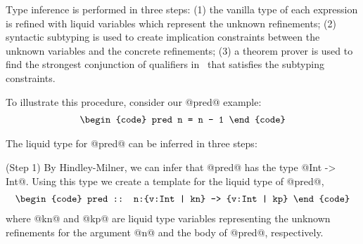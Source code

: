 Type inference is performed in three steps:
(1) the vanilla type of each expression is refined with liquid variables
which represent the unknown refinements;
(2) syntactic subtyping is used to create implication constraints 
between the unknown variables and the concrete refinements;
(3) a theorem prover is used to find the strongest conjunction
of qualifiers in \qset\
that satisfies the subtyping constraints.   

To illustrate this procedure, consider our @pred@ example:
$$\centering
\begin{tabular}{c}
\begin{code}
pred n = n - 1
\end{code}
\end{tabular}
$$

The liquid type for @pred@ can be inferred in three steps:

(Step 1) By Hindley-Milner, 
we can infer that @pred@ has the type @Int -> Int@.
Using this type we create a template for the liquid type of @pred@,
$$\centering
\begin{tabular}{c}
\begin{code}
pred :: n:{v:Int | kn} -> {v:Int | kp}
\end{code}
\end{tabular}
$$
where @kn@ and @kp@
are liquid type variables representing the unknown refinements for the 
argument @n@ and the body of @pred@, respectively.


